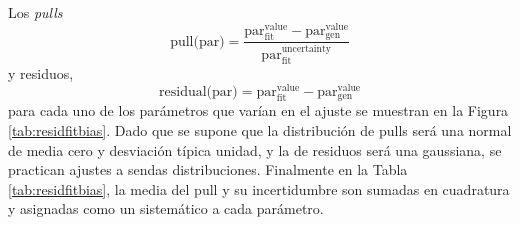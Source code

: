 Los \textit{pulls} 
\begin{equation}
  \text{pull(par)} = \mathrm{ \frac{ par_{fit}^{value} - par_{gen}^{value} }{ par_{fit}^{uncertainty} } }
\end{equation}
y residuos,
\begin{equation}
  \text{residual(par)} = \mathrm{  par_{fit}^{value} - par_{gen}^{value} } 
\end{equation}
para cada uno de los parámetros que varían en el ajuste se muestran en la Figura \ref{tab:residfitbias}. Dado que se supone que la distribución de pulls será una normal de media cero y desviación típica unidad, y la de residuos será una gaussiana, se practican ajustes a sendas distribuciones. Finalmente en la Tabla \ref{tab:residfitbias}, la media del pull y su incertidumbre son sumadas en cuadratura y asignadas como un sistemático a cada parámetro. 

